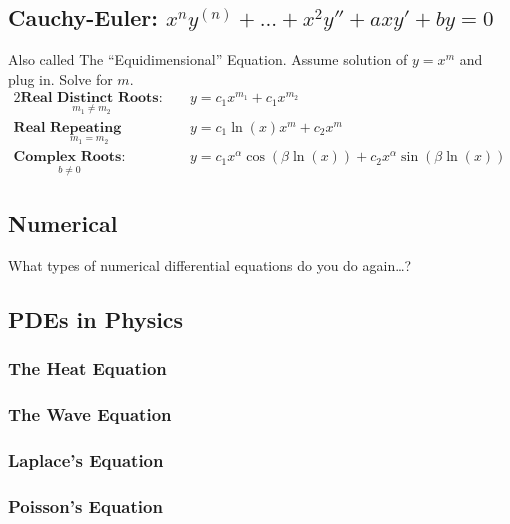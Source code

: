 \subsection*{Cauchy-Euler: $x^ny^{(n)}+...+x^2y''+axy'+by=0$}
    Also called The ``Equidimensional'' Equation. Assume solution of $y=x^m$ and plug in. Solve for $m$.
    \begin{alignat}{2}
        \underset { m_1 \neq m_2}{\textbf{Real Distinct Roots:}}
        &\quad y=c_1x^{m_1}+c_1x^{m_2}\\[0.7 cm]
        \underset{m_1=m_2}{\textbf{Real Repeating Roots:}}
        &\quad y=c_1\ln(x)x^m+c_2x^m\\[0.7 cm]
        \underset{b \neq 0}{\textbf{Complex Roots:}}
        &\quad y=c_{1}x^{\alpha }\cos(\beta \ln(x))+c_{2}x^{\alpha }\sin(\beta \ln(x))
    \end{alignat}
\subsection{Numerical}

    What types of numerical differential equations do you do again\ldots?
\subsection{PDEs in Physics}
    \subsubsection{The Heat Equation} %
    \subsubsection{The Wave Equation} %
    \subsubsection{Laplace's Equation} %
    \subsubsection{Poisson's Equation} %
%